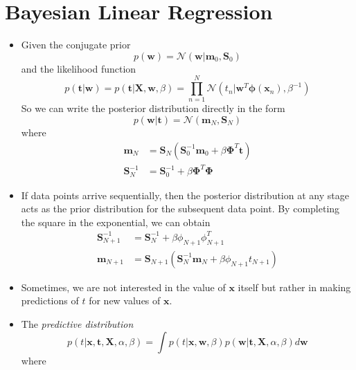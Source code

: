 \documentclass[12pt, a4paper]{article}
\newcommand{\N}{\mathcal{N}}
\begin{document}
    \section{Bayesian Linear Regression}
    \begin{itemize}
        \item Given the conjugate prior
        \begin{equation*}
            p(\bm{w})=\mathcal{N}(\bm{w}|\bm{m}_0,\bm{S}_0)
        \end{equation*}
        and the likelihood function
        \begin{equation*}
            p(\bm{t}|\bm{w})=p(\bm{t}|\bm{X},\bm{w},\beta)=\prod_{n=1}^N\N 
        (t_n|\bm{w}^T\bm{\phi}(\bm{x}_n),\beta^{-1})
        \end{equation*}
        So we can write the posterior distribution directly in the form
        \begin{equation*}
            p(\bm{w}|\bm{t})=\mathcal{N}(\bm{m}_N,\bm{S}_N)
        \end{equation*}
        where
        \begin{align*}
            \bm{m}_N&=\bm{S}_N(\bm{S}_0^{-1}\bm{m}_0+\beta\bm{\Phi}^T\bm{t})\\
            \bm{S}_N^{-1}&=\bm{S}_0^{-1}+\beta\bm{\Phi}^T\bm{\Phi}
        \end{align*}
        \item If data points arrive sequentially, then the posterior distribution at any stage acts as the
        prior distribution for the subsequent data point. By completing the square in the exponential, we 
        can obtain
        \begin{align*}
            \bm{S}_{N+1}^{-1}&=\bm{S}_N^{-1}+\beta\phi_{N+1}\phi_{N+1}^T\\
            \bm{m}_{N+1}&=\bm{S}_{N+1}(\bm{S}_N^{-1}\bm{m}_N+\beta\phi_{N+1}t_{N+1})
        \end{align*}
        \item Sometimes, we are not interested in the value of $\bm{x}$ itself but rather in making
        predictions of $t$ for new values of $\bm{x}$.
        \item The \textit{predictive distribution}
        \begin{equation*}
            p(t|\bm{x},\bm{t},\bm{X},\alpha,\beta)=\int p(t|\bm{x},\bm{w},\beta)
            p(\bm{w}|\bm{t},\bm{X},\alpha,\beta)d\bm{w}
        \end{equation*}
        where
        \begin{align*}

\end{align*}
\end{itemize}
\end{document}
